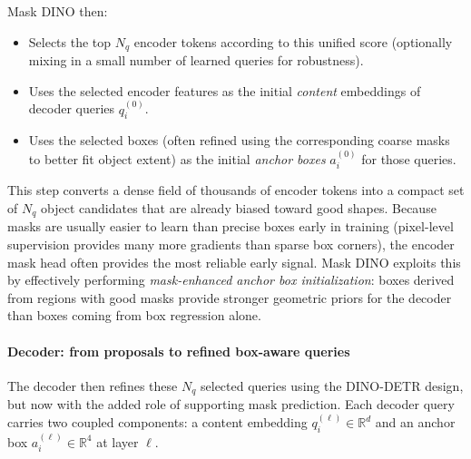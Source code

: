\begin{enrichment}
\begin{enrichment}
		Mask DINO then:
		\begin{itemize}
			\item Selects the top $N_q$ encoder tokens according to this unified score (optionally mixing in a small number of learned queries for robustness).
			\item Uses the selected encoder features as the initial \emph{content} embeddings of decoder queries $q_i^{(0)}$.
			
			\newpage
			
			\item Uses the selected boxes (often refined using the corresponding coarse masks to better fit object extent) as the initial \emph{anchor boxes} $a_i^{(0)}$ for those queries.
		\end{itemize}
		
		This step converts a dense field of thousands of encoder tokens into a compact set of $N_q$ object candidates that are already biased toward good shapes.
		Because masks are usually easier to learn than precise boxes early in training (pixel-level supervision provides many more gradients than sparse box corners), the encoder mask head often provides the most reliable early signal.
		Mask DINO exploits this by effectively performing \emph{mask-enhanced anchor box initialization}: boxes derived from regions with good masks provide stronger geometric priors for the decoder than boxes coming from box regression alone.
		
		\paragraph{Decoder: from proposals to refined box-aware queries}
		
		The decoder then refines these $N_q$ selected queries using the DINO-DETR design, but now with the added role of supporting mask prediction.
		Each decoder query carries two coupled components: a content embedding $q_i^{(\ell)} \in \mathbb{R}^d$ and an anchor box $a_i^{(\ell)} \in \mathbb{R}^4$ at layer $\ell$.
		

\end{enrichment}
\end{enrichment}
